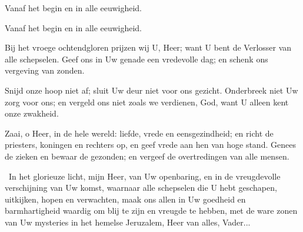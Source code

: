 \documentclass[12pt,twoside,a5paper]{article}
\begin{document}
\begin{doublecols}
  \dutchl Vanaf het begin en in alle eeuwigheid.

   Vanaf het begin en in alle eeuwigheid.

  \dutchl \begin{halfparskip}
    Bij het vroege ochtendgloren prijzen wij U, Heer; want U bent de Verlosser van alle schepselen. Geef ons in Uw genade een vredevolle dag; en schenk ons vergeving van zonden.

    Snijd onze hoop niet af; sluit Uw deur niet voor ons gezicht. Onderbreek niet Uw zorg voor ons; en vergeld ons niet zoals we verdienen, God, want U alleen kent onze zwakheid.

    Zaai, o Heer, in de hele wereld: liefde, vrede en eensgezindheid; en richt de priesters, koningen en rechters op, en geef vrede aan hen van hoge stand. Genees de zieken en bewaar de gezonden; en vergeef de overtredingen van alle mensen.
  \end{halfparskip}

   \begin{halfparskip}


  \end{halfparskip}
\end{doublecols}

\begin{halfparskip}
  \cc~In het glorieuze licht, mijn Heer, van Uw openbaring, en in de vreugdevolle verschijning van Uw komst, waarnaar alle schepselen die U hebt geschapen, uitkijken, hopen en verwachten, maak ons allen in Uw goedheid en barmhartigheid waardig om blij te zijn en vreugde te hebben, met de ware zonen van Uw mysteries in het hemelse Jeruzalem, Heer van alles, Vader...
\end{halfparskip}
\end{document}
